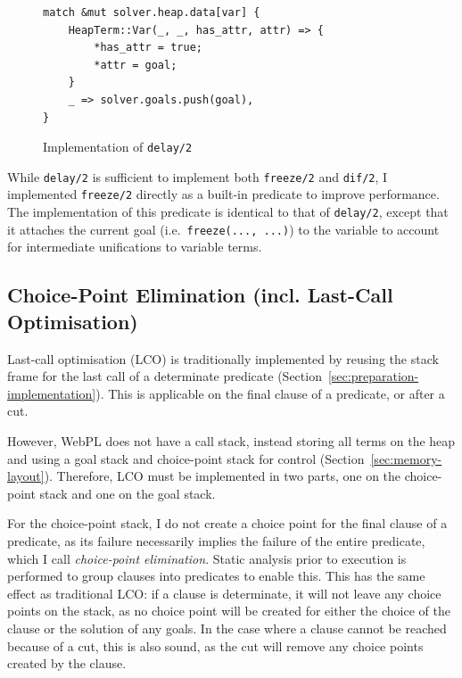 \begin{figure}[H]
\centering
\begin{verbatim}
match &mut solver.heap.data[var] {
    HeapTerm::Var(_, _, has_attr, attr) => {
        *has_attr = true;
        *attr = goal;
    }
    _ => solver.goals.push(goal),
}
\end{verbatim}
\caption{Implementation of \texttt{delay/2}}
\label{fig:delay-impl}
\end{figure}

While \texttt{delay/2} is sufficient to implement both \texttt{freeze/2} and \texttt{dif/2}, I implemented \texttt{freeze/2} directly as a built-in predicate to improve performance. The implementation of this predicate is identical to that of \texttt{delay/2}, except that it attaches the current goal (i.e.\ \texttt{freeze(..., ...)}) to the variable to account for intermediate unifications to variable terms.

\subsection{Choice-Point Elimination (incl. Last-Call Optimisation)}

\label{sec:choice-point-elimination}

Last-call optimisation (LCO) is traditionally implemented by reusing the stack frame for the last call of a determinate predicate (Section~\ref{sec:preparation-implementation}). This is applicable on the final clause of a predicate, or after a cut.

However, WebPL does not have a call stack, instead storing all terms on the heap and using a goal stack and choice-point stack for control (Section~\ref{sec:memory-layout}). Therefore, LCO must be implemented in two parts, one on the choice-point stack and one on the goal stack.

For the choice-point stack, I do not create a choice point for the final clause of a predicate, as its failure necessarily implies the failure of the entire predicate, which I call \emph{choice-point elimination}. Static analysis prior to execution is performed to group clauses into predicates to enable this. This has the same effect as traditional LCO: if a clause is determinate, it will not leave any choice points on the stack, as no choice point will be created for either the choice of the clause or the solution of any goals. In the case where a clause cannot be reached because of a cut, this is also sound, as the cut will remove any choice points created by the clause.

